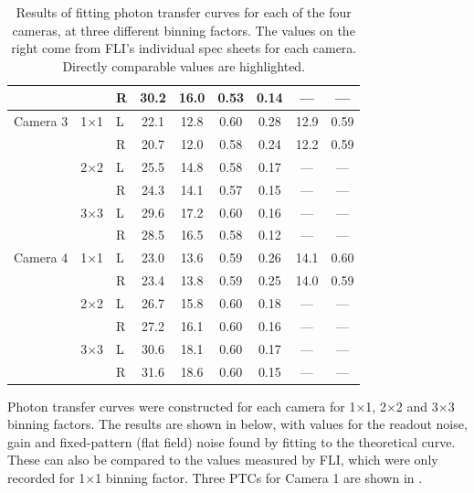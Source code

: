 \begin{colsection}
\begin{colsection}
\begin{table}[p]
\begin{center}
\begin{tabular}{lll|cccc|cc}
                     &            & R & 30.2       & 16.0       & 0.53     & 0.14 & ---       & ---         \\
            \midrule
            Camera 3 & 1$\times$1 & L & 22.1       & 12.8       & 0.60     & 0.28 & 12.9      & 0.59        \\
                     &            & R & 20.7       & 12.0       & 0.58     & 0.24 & 12.2      & 0.59        \\
                     & 2$\times$2 & L & 25.5       & 14.8       & 0.58     & 0.17 & ---       & ---         \\
                     &            & R & 24.3       & 14.1       & 0.57     & 0.15 & ---       & ---         \\
                     & 3$\times$3 & L & 29.6       & 17.2       & 0.60     & 0.16 & ---       & ---         \\
                     &            & R & 28.5       & 16.5       & 0.58     & 0.12 & ---       & ---         \\
            \midrule
            Camera 4 & 1$\times$1 & L & 23.0       & 13.6       & 0.59     & 0.26 & 14.1      & 0.60        \\
                     &            & R & 23.4       & 13.8       & 0.59     & 0.25 & 14.0      & 0.59        \\
                     & 2$\times$2 & L & 26.7       & 15.8       & 0.60     & 0.18 & ---       & ---         \\
                     &            & R & 27.2       & 16.1       & 0.60     & 0.16 & ---       & ---         \\
                     & 3$\times$3 & L & 30.6       & 18.1       & 0.60     & 0.17 & ---       & ---         \\
                     &            & R & 31.6       & 18.6       & 0.60     & 0.15 & ---       & ---         \\
        \end{tabular}
    \end{center}
    \caption[TODO]{
        Results of fitting photon transfer curves for each of the four cameras, at three different binning factors. The values on the right come from FLI's individual spec sheets for each camera. Directly comparable values are highlighted.
        }\label{tab:ptc}
\end{table}

Photon transfer curves were constructed for each camera for 1$\times$1, 2$\times$2 and 3$\times$3 binning factors. The results are shown in  below, with values for the readout noise, gain and fixed-pattern (flat field) noise found by fitting to the theoretical curve. These can also be compared to the values measured by FLI, which were only recorded for 1$\times$1 binning factor. Three PTCs for Camera 1 are shown in .


\end{colsection}
\end{colsection}
